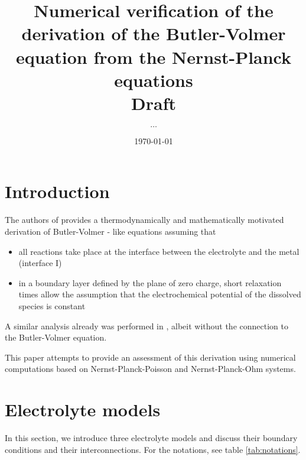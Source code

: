 \documentclass[12pt,oneside,reqno]{amsart}
\title[Verification of Butler-Volmer derivation]{Numerical verification of the derivation of the Butler-Volmer equation from
the Nernst-Planck equations\\ Draft}
\author{$\dots$}
\date{\today}
\numberwithin{equation}{section}
\begin{document}
\maketitle

\section{Introduction}

The authors of \cite{dreyer2016new} provides a thermodynamically and  mathematically motivated  derivation of
Butler-Volmer - like  equations assuming that 
\begin{itemize}
\item all reactions take place at the interface between the electrolyte
and the metal (interface I)
\item in a boundary layer defined by the plane of zero charge, short relaxation
  times allow the assumption that the electrochemical potential of the dissolved species
  is constant
\end{itemize}
A similar analysis already was performed in \cite{rubinstein1990electro}, albeit without the
connection to the Butler-Volmer equation.

This paper attempts to provide  an assessment of this derivation using
numerical    computations   based    on   Nernst-Planck-Poisson    and
Nernst-Planck-Ohm systems.

\section{Electrolyte models}

In this  section, we  introduce three  electrolyte models  and discuss
their boundary conditions and their interconnections. For the notations,
see table \ref{tab:notations}.

\end{document}
